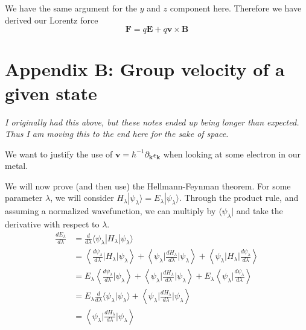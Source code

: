 \documentclass[12pt]{revtex4-2}
\begin{document}
We have the same argument for the $y$ and $z$ component here.  Therefore we have derived our Lorentz force 
\begin{equation}
    \boxed{ \mathbf{F} = q\mathbf{E} + q\mathbf{v}\times\mathbf{B} }
\end{equation}

\newpage
\section{Appendix B: Group velocity of a given state}

\em I originally had this above, but these notes ended up being longer than expected.  Thus I am moving this to the end here for the sake of space. \em 
\par

We want to justify the use of $\mathbf{v} = \hbar^{-1}\partial_\mathbf{k}\epsilon_\mathbf{k}$ when looking at some electron in our metal.
\par

We will now prove (and then use) the Hellmann-Feynman theorem.  For some parameter $\lambda$, we will consider $H_\lambda |\psi_\lambda\rangle = E_\lambda |\psi_\lambda \rangle$.  Through the product rule, and assuming a normalized wavefunction, we can multiply by $\langle \psi_\lambda|$ and take the derivative with respect to $\lambda$.
\begin{align}
    \frac{dE_\lambda}{d\lambda} &= \frac{d}{d\lambda}\langle \psi_\lambda | H_\lambda | \psi_\lambda\rangle \\
    &= \left\langle \frac{d\psi_\lambda}{d\lambda} \bigg| H_\lambda \bigg| \psi_\lambda \right\rangle + \left\langle \psi_\lambda \bigg| \frac{dH_\lambda}{d\lambda} \bigg| \psi_\lambda \right\rangle + \left\langle \psi_\lambda \bigg| H_\lambda \bigg| \frac{d\psi_\lambda}{d\lambda} \right\rangle \\
    &= E_\lambda \left\langle \frac{d\psi_\lambda}{d\lambda} \bigg| \psi_\lambda \right\rangle + \left\langle \psi_\lambda \bigg| \frac{dH_\lambda}{d\lambda} \bigg| \psi_\lambda \right\rangle + E_\lambda \left\langle \psi_\lambda \bigg| \frac{d\psi_\lambda}{d\lambda} \right\rangle \\
    &= E_\lambda \frac{d}{d\lambda} \langle \psi_\lambda | \psi_\lambda \rangle + \left\langle \psi_\lambda \bigg| \frac{dH_\lambda}{d\lambda} \bigg| \psi_\lambda \right\rangle \\
    &= \left\langle \psi_\lambda \bigg| \frac{dH_\lambda}{d\lambda} \bigg| \psi_\lambda \right\rangle
\end{align}
\end{document}
